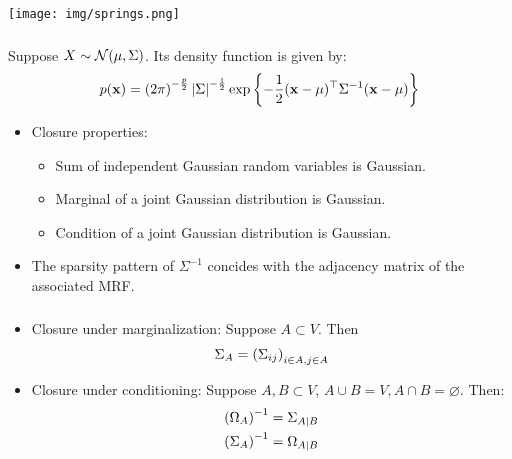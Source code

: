 \begin{frame}[fragile] \frametitle{}
    \begin{center}
        \texttt{[image: img/springs.png]}
    \end{center}
\end{frame}
\begin{frame}[fragile] \frametitle{}

    Suppose $X \sim \mathcal{N}(\mu, \Sigma)$. Its density function is given by:
	$$
    p(\mathbf{x}) = \left(2\pi\right)^{-\frac{p}{2}}\left|\Sigma\right|^{-\frac{1}{2}}
    \exp\left\{-\frac{1}{2}(\mathbf{x} - \mathbf{\mu})^\top \Sigma^{-1}
    (\mathbf{x} - \mathbf{\mu})\right\}
    $$
    \vspace{-0.7cm}
    \begin{itemize}
        \item Closure properties:
            \begin{itemize}
                \item Sum of independent Gaussian random variables is Gaussian.
                \item Marginal of a joint Gaussian distribution is Gaussian.
                \item Condition of a joint Gaussian distribution is Gaussian.
            \end{itemize}
        \item The sparsity pattern of $\Sigma^{-1}$ concides with the adjacency
            matrix of the associated MRF.
    \end{itemize}
\end{frame}
\begin{frame}[fragile] \frametitle{}

	\begin{itemize}
        \item Closure under marginalization:  Suppose $A \subset V$.  Then
            $$
            \Sigma_{A} = \left(\Sigma_{ij}\right)_{i\in A, j \in A}
            $$
        \item Closure under conditioning: Suppose  $A, B \subset V$, $A \cup B
            = V, A \cap B = \varnothing$.  Then:
            \begin{align*}
                \left( \Omega_A \right) ^{-1}  &= \Sigma_{A|B}   \\
                \left( \Sigma_A \right) ^{-1}  &= \Omega_{A|B}   \\
            \end{align*}
	\end{itemize}
\end{frame}
